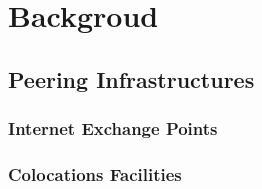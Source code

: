 \chapter{Backgroud}\label{cap:background}
\thispagestyle{empty}

	\section{Peering Infrastructures}
	\label{sec:peering-infra}

	\subsection{Internet Exchange Points}
	\label{sec:ixp}

	\cite{Chatzis:2013, Chatzis:2015:QVO:2717646.2717650, IXPInternetSociety}

	\subsection{Colocations Facilities}
	\label{sec:colos}

	\cite{Giotsas:2015:MPI:2716281.2836122, Kotronis:2017:STC:3131365.3131388}


	